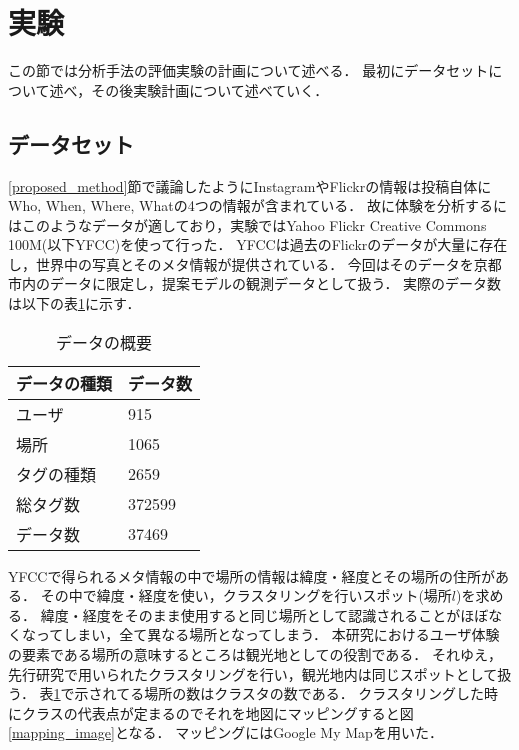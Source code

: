 \documentclass[a4j,10pt, twocolumn]{jarticle}
\begin{document}
\section{実験} \label{experiment}
この節では分析手法の評価実験の計画について述べる．
最初にデータセットについて述べ，その後実験計画について述べていく．

\subsection{データセット} \label{dataset}
\ref{proposed_method}節で議論したようにInstagramやFlickrの情報は投稿自体にWho, When, Where, Whatの4つの情報が含まれている．
故に体験を分析するにはこのようなデータが適しており，実験ではYahoo Flickr Creative Commons 100M(以下YFCC)\cite{thomee2016yfcc100m}を使って行った．
YFCCは過去のFlickrのデータが大量に存在し，世界中の写真とそのメタ情報が提供されている．
今回はそのデータを京都市内のデータに限定し，提案モデルの観測データとして扱う．
実際のデータ数は以下の表\ref{dataset-table}に示す．

\begin{table}[tb]
  \begin{center}
    \caption{データの概要}
    \label{dataset-table}
    \begin{tabular}{ p{5cm} p{1.5cm} } \hline \hline
      データの種類 & データ数 \\  \hline
      ユーザ & 915 \\
      場所 & 1065 \\
      タグの種類 & 2659 \\
      総タグ数 & 372599 \\ \hline
      データ数 & 37469 \\ \hline \hline
    \end{tabular}
  \end{center}
\end{table}

YFCCで得られるメタ情報の中で場所の情報は緯度・経度とその場所の住所がある．
その中で緯度・経度を使い，クラスタリングを行いスポット(場所$l$)を求める．
緯度・経度をそのまま使用すると同じ場所として認識されることがほぼなくなってしまい，全て異なる場所となってしまう．
本研究におけるユーザ体験の要素である場所の意味するところは観光地としての役割である．
それゆえ，先行研究\cite{sun2020dexa}で用いられたクラスタリングを行い，観光地内は同じスポットとして扱う．
表\ref{dataset-table}で示されてる場所の数はクラスタの数である．
クラスタリングした時にクラスの代表点が定まるのでそれを地図にマッピングすると図\ref{mapping_image}となる．
マッピングにはGoogle My Mapを用いた．
\end{document}
